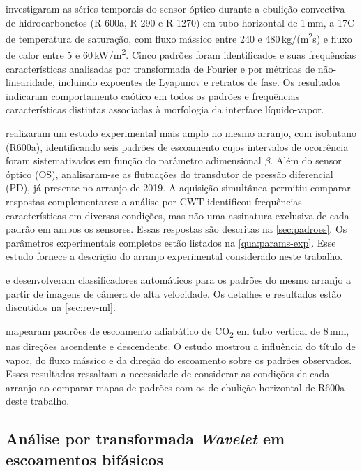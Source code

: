  investigaram as séries temporais do sensor óptico durante a
ebulição convectiva de hidrocarbonetos (R-600a, R-290 e R-1270) em tubo horizontal
de 1\,mm, a 17\textdegree{}C de temperatura de saturação, com fluxo mássico entre 240 e
480\,kg/(m\textsuperscript{2}s) e fluxo de calor entre 5 e 60\,kW/m\textsuperscript{2}.
Cinco padrões foram identificados e suas frequências características analisadas por
transformada de Fourier e por métricas de não-linearidade, incluindo expoentes de Lyapunov
e retratos de fase. Os resultados indicaram comportamento caótico em todos os padrões e
frequências características distintas associadas à morfologia da interface líquido-vapor.

 realizaram um estudo experimental mais amplo no mesmo arranjo,
com isobutano (R600a), identificando seis padrões de escoamento cujos intervalos de
ocorrência foram sistematizados em função do parâmetro adimensional $\beta$. Além do
sensor óptico (OS), analisaram-se as flutuações do transdutor de pressão diferencial
(PD), já presente no arranjo de 2019. A aquisição simultânea permitiu comparar
respostas complementares: a análise por CWT identificou frequências características
em diversas condições, mas não uma assinatura exclusiva de cada padrão em ambos
os sensores. Essas respostas são descritas na \autoref{sec:padroes}. Os parâmetros
experimentais completos estão listados na \autoref{qua:params-exp}.
Esse estudo fornece a descrição do arranjo experimental considerado neste trabalho.

 e  desenvolveram classificadores
automáticos para os padrões do mesmo arranjo a partir de imagens de câmera de alta
velocidade. Os detalhes e resultados estão discutidos na \autoref{sec:rev-ml}.

 mapearam padrões de escoamento adiabático de
CO\textsubscript{2} em tubo vertical de 8\,mm, nas direções ascendente e
descendente. O estudo mostrou a influência do título de vapor, do fluxo mássico
e da direção do escoamento sobre os padrões observados. Esses resultados
ressaltam a necessidade de considerar as condições de cada arranjo ao comparar
mapas de padrões com os de ebulição horizontal de R600a deste trabalho.

\subsection{Análise por transformada \textit{Wavelet} em escoamentos bifásicos}\label{sec:rev-wavelet}


